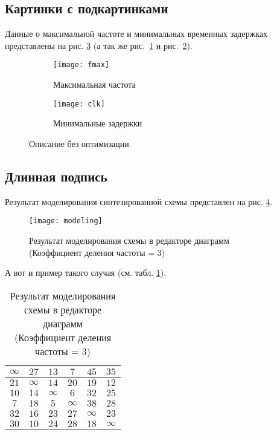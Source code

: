 \subsection{Картинки с подкартинками}

Данные о максимальной частоте и минимальных временных задержках представлены на рис. \ref{pic:base} (а так же рис.~\ref{pic:fmax} и рис.~\ref{pic:clk}).

\begin{figure}[h]
	\begin{subfigure}{.4\linewidth}\centering
		\texttt{[image: fmax]}
		\caption{Максимальная частота}
		\label{pic:fmax}
	\end{subfigure}
	\begin{subfigure}{.6\linewidth}\centering
		\texttt{[image: clk]}
		\caption{Минимальные задержки}
		\label{pic:clk}
	\end{subfigure}
\caption{Описание без оптимизации}
\label{pic:base}
\end{figure}

\subsection{Длинная подпись}

Результат моделирования синтезированной схемы представлен на рис. \ref{pic:modeling}. 

\begin{figure}[ht]
\centering
\captionsetup{justification=centering} %
\texttt{[image: modeling]}
\caption{Результат моделирования схемы в редакторе диаграмм \\ (Коэффициент деления частоты = 3)}
\label{pic:modeling}
\end{figure}

А вот и пример такого случая (см. табл. \ref{tab:task}).

\begin{table}[H]
	\centering
	\captionsetup{justification=raggedleft}
	\caption{Результат моделирования схемы в редакторе диаграмм \\ (Коэффициент деления частоты = 3)}
	\begin{tabular}{|c|c|c|c|c|c|}
		\hline $\infty$& $27$ & $13$ & $7$ & $45$ & $35$ \\
		\hline $21$ & $\infty$ & $14$ & $20$ & $19$ & $12$ \\
		\hline $10$ & $14$ & $\infty$ & $6$ & $32$ & $25$ \\
		\hline $7$ & $18$ & $5$ & $\infty$ & $38$ & $28$ \\
		\hline $32$ & $16$ & $23$ & $27$ & $\infty$ & $23$ \\
		\hline $30$ & $10$ & $24$ & $28$ & $18$ & $\infty$ \\
		\hline		
	\end{tabular}
	\label{tab:task}
\end{table}

